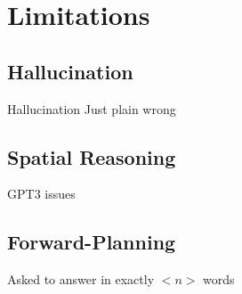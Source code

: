 \section{Limitations}
\subsection{Hallucination}
\begin{frame}[c]{Hallucination}
    Just plain wrong
\end{frame}

\subsection{Spatial Reasoning}
\begin{frame}[c]
    GPT3 issues
\end{frame}

\subsection{Forward-Planning}
\begin{frame}[c]
    Asked to answer in exactly $<n>$ words
\end{frame}


